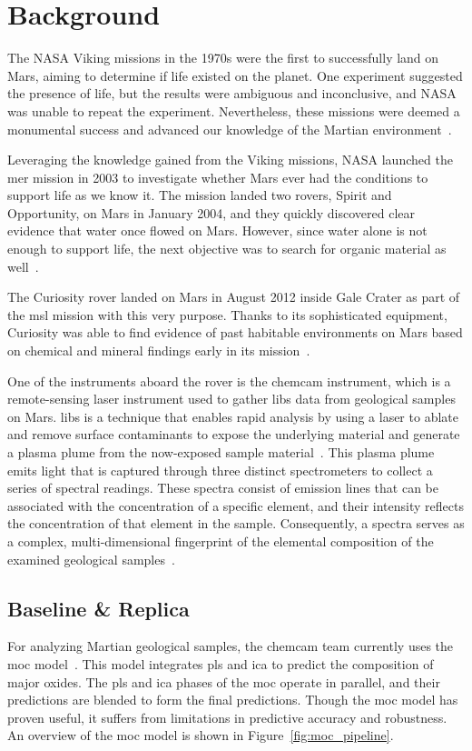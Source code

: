 \section{Background}\label{sec:background}
The NASA Viking missions in the 1970s were the first to successfully land on Mars, aiming to determine if life existed on the planet.
One experiment suggested the presence of life, but the results were ambiguous and inconclusive, and NASA was unable to repeat the experiment.
Nevertheless, these missions were deemed a monumental success and advanced our knowledge of the Martian environment~\cite{marsnasagov_vikings}.

Leveraging the knowledge gained from the Viking missions, NASA launched the \gls{mer} mission in 2003 to investigate whether Mars ever had the conditions to support life as we know it.
The mission landed two rovers, Spirit and Opportunity, on Mars in January 2004, and they quickly discovered clear evidence that water once flowed on Mars.
However, since water alone is not enough to support life, the next objective was to search for organic material as well~\cite{marsnasagov_observer, marsnasagov_spirit_opportunity}.

The Curiosity rover landed on Mars in August 2012 inside Gale Crater as part of the \gls{msl} mission with this very purpose.
Thanks to its sophisticated equipment, Curiosity was able to find evidence of past habitable environments on Mars based on chemical and mineral findings early in its mission~\cite{marsnasagov_msl}.

One of the instruments aboard the rover is the \gls{chemcam} instrument, which is a remote-sensing laser instrument used to gather \gls{libs} data from geological samples on Mars.
\gls{libs} is a technique that enables rapid analysis by using a laser to ablate and remove surface contaminants to expose the underlying material and generate a plasma plume from the now-exposed sample material~\cite{wiensChemcam2012}.
This plasma plume emits light that is captured through three distinct spectrometers to collect a series of spectral readings.
These spectra consist of emission lines that can be associated with the concentration of a specific element, and their intensity reflects the concentration of that element in the sample.
Consequently, a spectra serves as a complex, multi-dimensional fingerprint of the elemental composition of the examined geological samples~\cite{cleggRecalibrationMarsScience2017}.

\subsection{Baseline \& Replica}
For analyzing Martian geological samples, the \gls{chemcam} team currently uses the \gls{moc} model~\cite{cleggRecalibrationMarsScience2017}.
This model integrates \gls{pls} and \gls{ica} to predict the composition of major oxides.
The \gls{pls} and \gls{ica} phases of the \gls{moc} operate in parallel, and their predictions are blended to form the final predictions.
Though the \gls{moc} model has proven useful, it suffers from limitations in predictive accuracy and robustness.
An overview of the \gls{moc} model is shown in Figure~\ref{fig:moc_pipeline}.

